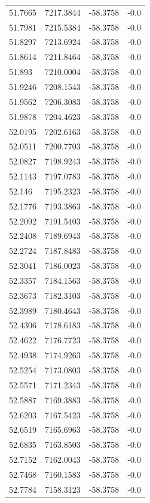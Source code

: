 \begin{table}[H]
\begin{tabular}{llll}
51.7665 & 7217.3844 & -58.3758 & -0.0 \\
51.7981 & 7215.5384 & -58.3758 & -0.0 \\
51.8297 & 7213.6924 & -58.3758 & -0.0 \\
51.8614 & 7211.8464 & -58.3758 & -0.0 \\
51.893 & 7210.0004 & -58.3758 & -0.0 \\
51.9246 & 7208.1543 & -58.3758 & -0.0 \\
51.9562 & 7206.3083 & -58.3758 & -0.0 \\
51.9878 & 7204.4623 & -58.3758 & -0.0 \\
52.0195 & 7202.6163 & -58.3758 & -0.0 \\
52.0511 & 7200.7703 & -58.3758 & -0.0 \\
52.0827 & 7198.9243 & -58.3758 & -0.0 \\
52.1143 & 7197.0783 & -58.3758 & -0.0 \\
52.146 & 7195.2323 & -58.3758 & -0.0 \\
52.1776 & 7193.3863 & -58.3758 & -0.0 \\
52.2092 & 7191.5403 & -58.3758 & -0.0 \\
52.2408 & 7189.6943 & -58.3758 & -0.0 \\
52.2724 & 7187.8483 & -58.3758 & -0.0 \\
52.3041 & 7186.0023 & -58.3758 & -0.0 \\
52.3357 & 7184.1563 & -58.3758 & -0.0 \\
52.3673 & 7182.3103 & -58.3758 & -0.0 \\
52.3989 & 7180.4643 & -58.3758 & -0.0 \\
52.4306 & 7178.6183 & -58.3758 & -0.0 \\
52.4622 & 7176.7723 & -58.3758 & -0.0 \\
52.4938 & 7174.9263 & -58.3758 & -0.0 \\
52.5254 & 7173.0803 & -58.3758 & -0.0 \\
52.5571 & 7171.2343 & -58.3758 & -0.0 \\
52.5887 & 7169.3883 & -58.3758 & -0.0 \\
52.6203 & 7167.5423 & -58.3758 & -0.0 \\
52.6519 & 7165.6963 & -58.3758 & -0.0 \\
52.6835 & 7163.8503 & -58.3758 & -0.0 \\
52.7152 & 7162.0043 & -58.3758 & -0.0 \\
52.7468 & 7160.1583 & -58.3758 & -0.0 \\
52.7784 & 7158.3123 & -58.3758 & -0.0 \\

\end{tabular}
\end{table}
